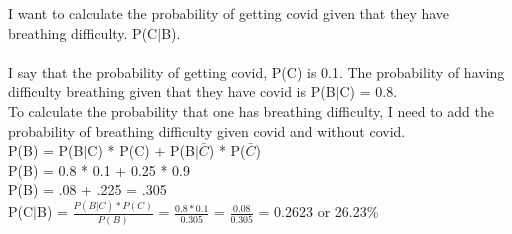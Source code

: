\documentclass[11pt]{article}
\begin{document}
\noindent I want to calculate the probability of getting covid given that they have breathing difficulty. P(C\(|\)B).\\\\
I say that the probability of getting covid, P(C) is 0.1. 
The probability of having difficulty breathing given that they have covid is P(B$|$C) = 0.8.\\

\noindent To calculate the probability that one has breathing difficulty, I need to add the probability of breathing difficulty given covid and without covid. \\

\noindent P(B) = P(B$|$C) * P(C) + P(B$|\bar{C}$) * P($\bar{C}$)\\
P(B) = 0.8 * 0.1 + 0.25 * 0.9\\
P(B) = .08 + .225 = .305\\


\noindent P(C\(|\)B) = $\frac{P(B|C) * P(C)}{P(B)}$ = $\frac{0.8 * 0.1}{0.305}$ = $\frac{0.08}{0.305}$ = 0.2623 or 26.23\%


\newpage
\end{document}
